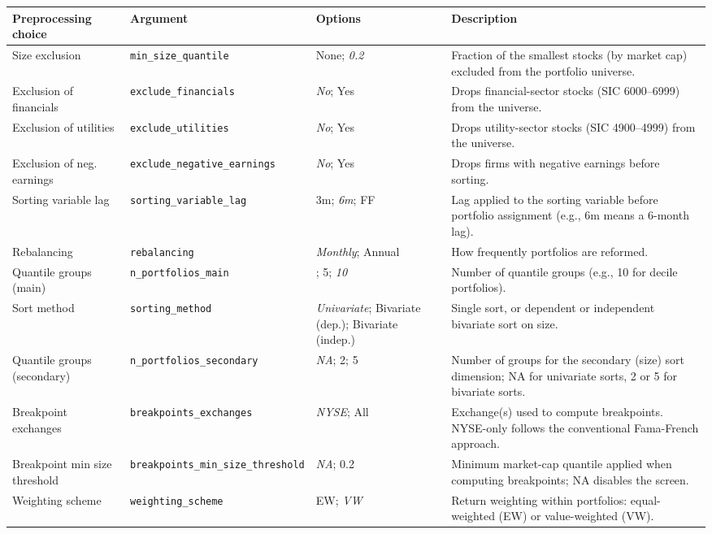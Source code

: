 \documentclass[
  article]{jss}
\begin{document}
\begin{longtable}{>{\raggedright\arraybackslash}p{2.4cm}>{\raggedright\arraybackslash}p{3.2cm}>{\raggedright\arraybackslash}p{2.8cm}>{\raggedright\arraybackslash}p{4.8cm}}

\toprule
Preprocessing choice & Argument & Options & Description\\
\midrule
Size exclusion & \texttt{min\_\allowbreak size\_\allowbreak quantile} & None; \emph{0.2} & Fraction of the smallest stocks (by market cap) excluded from the portfolio universe.\\
Exclusion of financials & \texttt{exclude\_\allowbreak financials} & \emph{No}; Yes & Drops financial-sector stocks (SIC 6000--6999) from the universe.\\
Exclusion of utilities & \texttt{exclude\_\allowbreak utilities} & \emph{No}; Yes & Drops utility-sector stocks (SIC 4900--4999) from the universe.\\
Exclusion of neg. earnings & \texttt{exclude\_\allowbreak negative\_\allowbreak earnings} & \emph{No}; Yes & Drops firms with negative earnings before sorting.\\
Sorting variable lag & \texttt{sorting\_\allowbreak variable\_\allowbreak lag} & 3m; \emph{6m}; FF & Lag applied to the sorting variable before portfolio assignment (e.g., 6m means a 6-month lag).\\
Rebalancing & \texttt{rebalancing} & \emph{Monthly}; Annual & How frequently portfolios are reformed.\\
Quantile groups (main) & \texttt{n\_\allowbreak portfolios\_\allowbreak main} & 3; 5; \emph{10} & Number of quantile groups (e.g., 10 for decile portfolios).\\
Sort method & \texttt{sorting\_\allowbreak method} & \emph{Univariate}; Bivariate (dep.); Bivariate (indep.) & Single sort, or dependent or independent bivariate sort on size.\\
Quantile groups (secondary) & \texttt{n\_\allowbreak portfolios\_\allowbreak secondary} & \emph{NA}; 2; 5 & Number of groups for the secondary (size) sort dimension; NA for univariate sorts, 2 or 5 for bivariate sorts.\\
Breakpoint exchanges & \texttt{breakpoints\_\allowbreak exchanges} & \emph{NYSE}; All & Exchange(s) used to compute breakpoints. NYSE-only follows the conventional Fama-French approach.\\
Breakpoint min size threshold & \texttt{breakpoints\_\allowbreak min\_\allowbreak size\_\allowbreak threshold} & \emph{NA}; 0.2 & Minimum market-cap quantile applied when computing breakpoints; NA disables the screen.\\
Weighting scheme & \texttt{weighting\_\allowbreak scheme} & EW; \emph{VW} & Return weighting within portfolios: equal-weighted (EW) or value-weighted (VW).\\
\bottomrule



\end{longtable}
\end{document}
